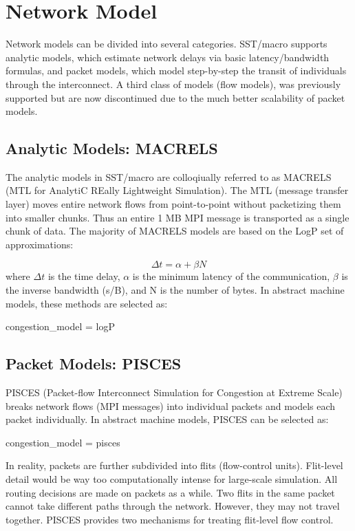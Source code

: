 
\section{Network Model}
\label{sec:tutorial:networkmodel}

Network models can be divided into several categories.  SST/macro supports analytic models, which estimate network delays via basic latency/bandwidth formulas, and packet models, which model step-by-step the transit of individuals through the interconnect.
A third class of models (flow models), was previously supported but are now discontinued due to the much better scalability of packet models.

\subsection{Analytic Models: MACRELS}
\label{subsec:tutorial:macrels}

The analytic models in SST/macro are colloqiually referred to as MACRELS (MTL for AnalytiC REally Lightweight Simulation).
The MTL (message transfer layer) moves entire network flows from point-to-point without packetizing them into smaller chunks.
Thus an entire 1 MB MPI message is transported as a single chunk of data.  
The majority of MACRELS models are based on the LogP set of approximations:

\[
\Delta t = \alpha + \beta N
\]
where $\Delta t$ is the time delay, $\alpha$ is the minimum latency of the communication, $\beta$ is the inverse bandwidth (s/B), and N is the number of bytes.
In abstract machine models, these methods are selected as:

\begin{ViFile}
congestion_model = logP
\end{ViFile}

\subsection{Packet Models: PISCES}
\label{subsec:tutorial:pisces}

PISCES (Packet-flow Interconnect Simulation for Congestion at Extreme Scale) breaks network flows (MPI messages) into individual packets and models each packet individually.
In abstract machine models, PISCES can be selected as:

\begin{ViFile}
congestion_model = pisces
\end{ViFile}
In reality, packets are further subdivided into flits (flow-control units).
Flit-level detail would be way too computationally intense for large-scale simulation.
All routing decisions are made on packets as a while. 
Two flits in the same packet cannot take different paths through the network.
However, they may not travel together.
PISCES provides two mechanisms for treating flit-level flow control.

